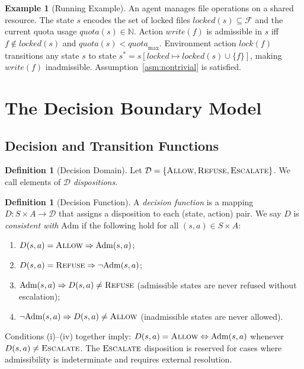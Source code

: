 \documentclass[11pt]{article}
\theoremstyle{plain}
\theoremstyle{definition}
\newtheorem{definition}[theorem]{Definition}
\newtheorem{example}[theorem]{Example}
\theoremstyle{remark}
\newcommand{\Allow}{\textsc{Allow}}
\newcommand{\Refuse}{\textsc{Refuse}}
\newcommand{\Escalate}{\textsc{Escalate}}
\newcommand{\Dset}{\mathcal{D}}
\newcommand{\Adm}{\mathrm{Adm}}
\begin{document}
\begin{example}[Running Example]
\label{ex:running}
An agent manages file operations on a shared resource.  The state $s$ encodes
the set of locked files $\mathit{locked}(s) \subseteq \mathcal{F}$ and the
current quota usage $\mathit{quota}(s) \in \mathbb{N}$.  Action $\mathit{write}(f)$
is admissible in $s$ iff $f \notin \mathit{locked}(s)$ and
$\mathit{quota}(s) < \mathit{quota}_{\max}$.  Environment action
$\mathit{lock}(f)$ transitions any state $s$ to state $s^* = s[\mathit{locked}
\mapsto \mathit{locked}(s) \cup \{f\}]$, making $\mathit{write}(f)$ inadmissible.
Assumption~\ref{asm:nontrivial} is satisfied.
\end{example}

\section{The Decision Boundary Model}
\label{sec:dbm}

\subsection{Decision and Transition Functions}

\begin{definition}[Decision Domain]
Let $\Dset = \{\Allow, \Refuse, \Escalate\}$.  We call elements of $\Dset$
\emph{dispositions}.
\end{definition}

\begin{definition}[Decision Function]
\label{def:decfun}
A \emph{decision function} is a mapping
$D : S \times A \to \Dset$
that assigns a disposition to each (state, action) pair.  We say $D$ is
\emph{consistent with} $\Adm$ if the following hold for all $(s,a) \in S \times A$:
\begin{enumerate}[label=(\roman*)]
  \item $D(s, a) = \Allow \Rightarrow \Adm(s, a)$;
  \item $D(s, a) = \Refuse \Rightarrow \neg\Adm(s, a)$;
  \item $\Adm(s, a) \Rightarrow D(s, a) \neq \Refuse$
        \quad (admissible states are never refused without escalation);
  \item $\neg\Adm(s, a) \Rightarrow D(s, a) \neq \Allow$
        \quad (inadmissible states are never allowed).
\end{enumerate}
Conditions (i)--(iv) together imply:
$D(s,a) = \Allow \Leftrightarrow \Adm(s,a)$ whenever $D(s,a) \neq \Escalate$.
The $\Escalate$ disposition is reserved for cases where admissibility is
indeterminate and requires external resolution.
\end{definition}
\end{document}
